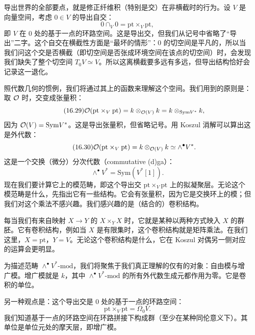导出世界的全部要点，就是修正纤维积（特别是交）在非横截时的行为。设 $V$ 是向量空间，考虑 $0\in V$ 的导出自交：
\begin{equation}\tag{16.28}
0\cap_V0=\mathrm{pt}\times_V\mathrm{pt},
\end{equation}
即 $V$ 在 $0$ 处的基于一点的环路空间。这是导出交，但我们从记号中省略了“导出”二字。这个自交在横截性方面是“最坏的情形”：$0$ 的切空间是平凡的，所以当我们问这个交是否横截（即切空间是否张成环境空间在该点的切空间）时，会发现我们缺失了整个切空间 $T_0V\simeq V$。所以这离横截要多远有多远，但导出结构恰好会记录这一退化。

照代数几何的惯例，我们将通过其上的函数来理解这个空间。我们用到的原则是：取 $\mathcal{O}$ 时，交变成张量积：
\begin{equation}\tag{16.29}
\mathcal{O}(\mathrm{pt}\times_V\mathrm{pt})=k\otimes_{\mathcal{O}(V)}k=k\otimes_{\mathrm{Sym}V^*}k,
\end{equation}
因为 $\mathcal{O}(V)=\mathrm{Sym}V^*$。这是导出张量积，但省略记号。用 Koszul 消解可以算出这是外代数：
\begin{equation}\tag{16.30}
\mathcal{O}(\mathrm{pt}\times_V\mathrm{pt})=k\otimes_{\mathcal{O}(V)}k\simeq\wedge^\bullet V^*.
\end{equation}
这是一个交换（微分）分次代数（commutative (d)ga）：
\begin{equation}\tag{16.31}
\wedge^\bullet V^*=\mathrm{Sym}(V^*[1]).
\end{equation}
现在我们要计算它上的模范畴，即这个导出交 $\mathrm{pt}\times_V\mathrm{pt}$ 上的拟凝聚层。无论这个模范畴是什么，先指出它有一些结构。它会有张量积，因为它是交换环上的模；但我们对这个乘法不感兴趣。我们感兴趣的是（结合的）卷积结构。

每当我们有来自映射 $X\to Y$ 的 $X\times_YX$ 时，它就是某种以两种方式映入 $X$ 的群胚。它有卷积结构，例如当 $X$ 是有限集时，这个卷积结构就是矩阵乘法。在我们这里，$X=\mathrm{pt}$，$Y=V$。无论这个卷积结构是什么，它在 Koszul 对偶另一侧对应的运算会更明显。

为描述范畴 $\wedge^\bullet V^*\text{-}\mathrm{mod}$，我们将聚焦于我们真正理解的仅有的对象：自由模与增广模。增广模就是 $k$，其中 $\wedge^\bullet V^*\text{-}\mathrm{mod}$ 的所有外代数生成元都作用为零。它是卷积的单位。

另一种观点是：这个导出交是 $0$ 处的基于一点的环路空间：
\begin{equation}\tag{16.32}
\mathrm{pt}\times_V\mathrm{pt}=\Omega_0V.
\end{equation}
我们知道基于一点的环路空间在环路拼接下构成群（至少在某种同伦意义下）。其单位是单位元处的摩天层，即增广模。

